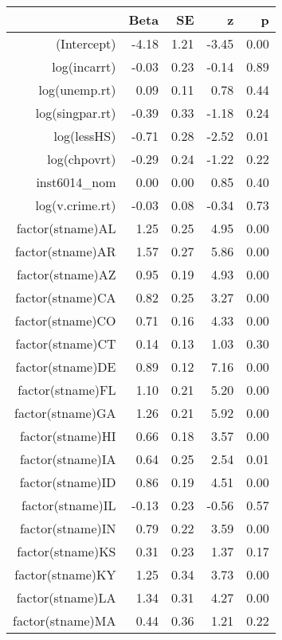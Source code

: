 \begin{table}[ht]
\centering
\begin{tabular}{rrrrr}
  \hline
 & Beta & SE & z & p \\ 
  \hline
(Intercept) & -4.18 & 1.21 & -3.45 & 0.00 \\ 
  log(incarrt) & -0.03 & 0.23 & -0.14 & 0.89 \\ 
  log(unemp.rt) & 0.09 & 0.11 & 0.78 & 0.44 \\ 
  log(singpar.rt) & -0.39 & 0.33 & -1.18 & 0.24 \\ 
  log(lessHS) & -0.71 & 0.28 & -2.52 & 0.01 \\ 
  log(chpovrt) & -0.29 & 0.24 & -1.22 & 0.22 \\ 
  inst6014\_nom & 0.00 & 0.00 & 0.85 & 0.40 \\ 
  log(v.crime.rt) & -0.03 & 0.08 & -0.34 & 0.73 \\ 
  factor(stname)AL & 1.25 & 0.25 & 4.95 & 0.00 \\ 
  factor(stname)AR & 1.57 & 0.27 & 5.86 & 0.00 \\ 
  factor(stname)AZ & 0.95 & 0.19 & 4.93 & 0.00 \\ 
  factor(stname)CA & 0.82 & 0.25 & 3.27 & 0.00 \\ 
  factor(stname)CO & 0.71 & 0.16 & 4.33 & 0.00 \\ 
  factor(stname)CT & 0.14 & 0.13 & 1.03 & 0.30 \\ 
  factor(stname)DE & 0.89 & 0.12 & 7.16 & 0.00 \\ 
  factor(stname)FL & 1.10 & 0.21 & 5.20 & 0.00 \\ 
  factor(stname)GA & 1.26 & 0.21 & 5.92 & 0.00 \\ 
  factor(stname)HI & 0.66 & 0.18 & 3.57 & 0.00 \\ 
  factor(stname)IA & 0.64 & 0.25 & 2.54 & 0.01 \\ 
  factor(stname)ID & 0.86 & 0.19 & 4.51 & 0.00 \\ 
  factor(stname)IL & -0.13 & 0.23 & -0.56 & 0.57 \\ 
  factor(stname)IN & 0.79 & 0.22 & 3.59 & 0.00 \\ 
  factor(stname)KS & 0.31 & 0.23 & 1.37 & 0.17 \\ 
  factor(stname)KY & 1.25 & 0.34 & 3.73 & 0.00 \\ 
  factor(stname)LA & 1.34 & 0.31 & 4.27 & 0.00 \\ 
  factor(stname)MA & 0.44 & 0.36 & 1.21 & 0.22 \\ 

\end{tabular}
\end{table}
